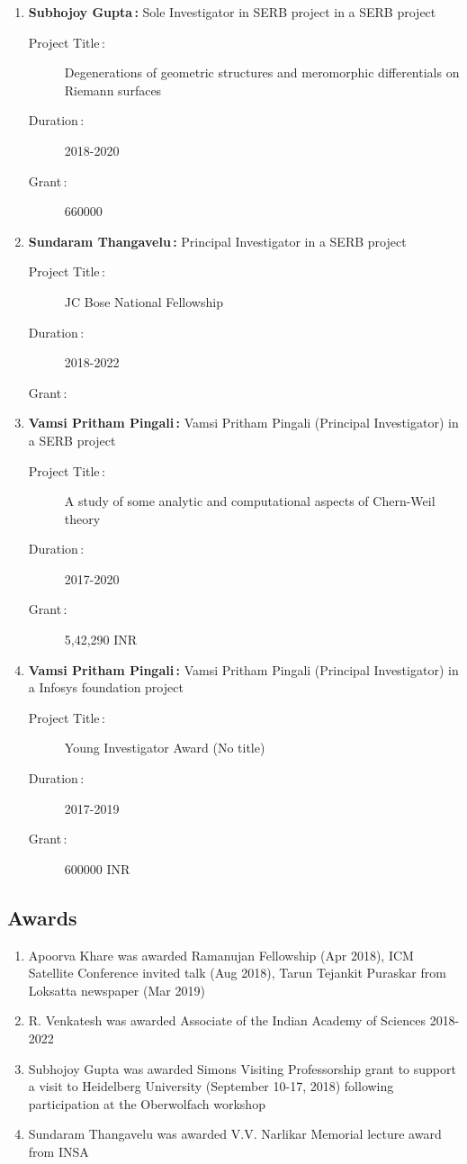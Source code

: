 \begin{enumerate}
\item {\bf Subhojoy Gupta\,:} Sole Investigator in SERB project in a SERB project
\begin{description}
  \item[Project Title\,:] Degenerations of geometric structures and meromorphic differentials on Riemann surfaces
  \item[Duration\,:] 2018-2020
  \item[Grant\,:] 660000
\end{description}


\item {\bf Sundaram Thangavelu\,:} Principal Investigator in a SERB project
\begin{description}
  \item[Project Title\,:] JC Bose National Fellowship
  \item[Duration\,:] 2018-2022
  \item[Grant\,:] 
\end{description}


\item {\bf Vamsi Pritham Pingali\,:} Vamsi Pritham Pingali (Principal Investigator) in a SERB project
\begin{description}
  \item[Project Title\,:] A study of some analytic and computational aspects of Chern-Weil theory
  \item[Duration\,:] 2017-2020
  \item[Grant\,:] 5,42,290 INR
\end{description}


\item {\bf Vamsi Pritham Pingali\,:} Vamsi Pritham Pingali (Principal Investigator) in a Infosys foundation project
\begin{description}
  \item[Project Title\,:] Young Investigator Award (No title)
  \item[Duration\,:] 2017-2019
  \item[Grant\,:] 600000 INR 
\end{description}

\end{enumerate}


\subsection{Awards}

\begin{enumerate}
\item Apoorva Khare was awarded Ramanujan Fellowship (Apr 2018), ICM Satellite Conference invited talk (Aug 2018), Tarun Tejankit Puraskar from Loksatta newspaper (Mar 2019)
\item R. Venkatesh was awarded Associate of the Indian Academy of Sciences 2018-2022
\item Subhojoy Gupta was awarded Simons Visiting Professorship grant to support a visit to Heidelberg University (September 10-17, 2018) following participation at the Oberwolfach workshop
\item Sundaram Thangavelu was awarded V.V. Narlikar Memorial lecture award from INSA
\end{enumerate}

